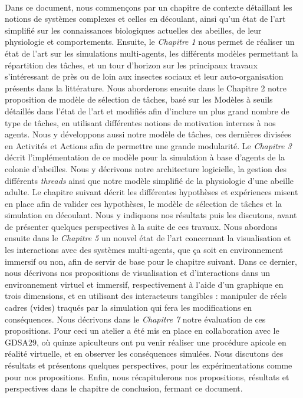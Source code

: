 	\paragraph{}
	Dans ce document, nous commençons par un chapitre de contexte détaillant les notions de systèmes complexes et celles en découlant, ainsi qu'un état de l'art simplifié sur les connaissances biologiques actuelles des abeilles, de leur physiologie et comportements.
	 Ensuite, le \textit{Chapitre 1} nous permet de réaliser un état de l'art sur les simulations multi-agents, les différents modèles permettant la répartition des tâches, et un tour d'horizon sur les principaux travaux s'intéressant de près ou de loin aux insectes sociaux et leur auto-organisation présents dans la littérature. 
	 Nous aborderons ensuite dans le Chapitre 2 notre proposition de modèle de sélection de tâches, basé sur les Modèles à seuils détaillés dans l'état de l'art et modifiés afin d'inclure un plus grand nombre de type de tâches, en utilisant différentes notions de motivation internes à nos agents. Nous y développons aussi notre modèle de tâches, ces dernières divisées en Activités et Actions afin de permettre une grande modularité. 
	 Le \textit{Chapitre 3} décrit l'implémentation de ce modèle pour la simulation à base d'agents de la colonie d'abeilles. Nous y décrivons notre architecture logicielle, la gestion des différents \textit{threads} ainsi que notre modèle simplifié de la physiologie d'une abeille adulte. 
	 Le chapitre suivant décrit les différentes hypothèses et expériences misent en place afin de valider ces hypothèses, le modèle de sélection de tâches et la simulation en découlant. Nous y indiquons nos résultats puis les discutons, avant de présenter quelques perspectives à la suite de ces travaux. 
	 Nous abordons ensuite dans le \textit{Chapitre 5} un nouvel état de l'art concernant la visualisation et les interactions avec des systèmes multi-agents, que ça soit en environnement immersif ou non, afin de servir de base pour le chapitre suivant. 
	 Dans ce dernier, nous décrivons nos propositions de visualisation et d'interactions dans un environnement virtuel et immersif, respectivement à l'aide d'un graphique en trois dimensions, et en utilisant des interacteurs tangibles : manipuler de réels cadres (vides) traqués par la simulation qui fera les modifications en conséquences. 
	 Nous décrivons dans le \textit{Chapitre 7} notre évaluation de ces propositions. Pour ceci un atelier a été mis en place en collaboration avec le GDSA29, où quinze apiculteurs ont pu venir réaliser une procédure apicole en réalité virtuelle, et en observer les conséquences simulées. Nous discutons des résultats et présentons quelques perspectives, pour les expérimentations comme pour nos propositions. 
	 Enfin, nous récapitulerons nos propositions, résultats et perspectives dans le chapitre de conclusion, fermant ce document.